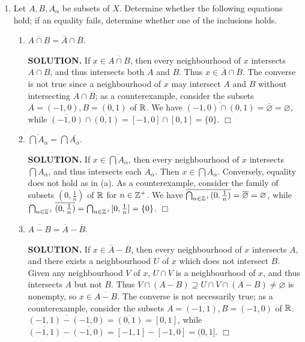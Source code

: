 \documentclass{article}
\begin{document}
\begin{enumerate}
    {\bf SOLUTION.} While it is true that every neighbourhood of $x$ intersects some $A_\alpha$, this is insufficient to conclude that $x \in \overline{A_\alpha}$ for some $\alpha$, which would require that every neighbourhood of $x$ intersects a particular $A_\alpha$. $\Box$

    \item Let $A, B, A_\alpha$ be subsets of $X$. Determine whether the following equations hold; if an equality fails, determine whether one of the inclusions holds.
    \begin{enumerate}
        \item $\overline{A \cap B} = \overline{A} \cap \overline{B}$.

        {\bf SOLUTION.} If $x \in \overline{A \cap B}$, then every neighbourhood of $x$ intersects $A \cap B$, and thus intersects both $A$ and $B$. Thus $x \in \overline{A} \cap \overline{B}$. The converse is not true since a neighbourhood of $x$ may intersect $A$ and $B$ without intersecting $A \cap B$; as a counterexample, consider the subsets $A = (-1, 0), B = (0, 1)$ of $\mathbb{R}$. We have $\overline{(-1, 0) \cap (0, 1)} = \overline{\varnothing} = \varnothing$, while $\overline{(-1, 0)} \cap \overline{(0, 1)} = [-1, 0] \cap [0, 1] = \{0\}$. $\Box$
        
        \item $\overline{\bigcap A_\alpha} = \bigcap \overline{A_\alpha}$.

        {\bf SOLUTION.} If $x \in \overline{\bigcap A_\alpha}$, then every neighbourhood of $x$ intersects $\bigcap A_\alpha$, and thus intersects each $A_\alpha$. Then $x \in \bigcap \overline{A_\alpha}$. Conversely, equality does not hold as in (a). As a counterexample, consider the family of subsets $(0, \frac1n)$ of $\mathbb{R}$ for $n \in \mathbb{Z}^+$. We have $\overline{\bigcap_{n \in \mathbb{Z}^+} (0, \frac1n)} = \overline{\varnothing} = \varnothing$, while $\bigcap_{n \in \mathbb{Z}^+} \overline{(0, \frac1n)} = \bigcap_{n \in \mathbb{Z}^+} [0, \frac1n] = \{0\}$. $\Box$
        
        \item $\overline{A - B} = \overline{A} - \overline{B}$.

        {\bf SOLUTION.} If $x \in \overline{A} - \overline{B}$, then every neighbourhood of $x$ intersects $A$, and there exists a neighbourhood $U$ of $x$ which does not intersect $B$. Given any neighbourhood $V$ of $x$, $U \cap V$ is a neighbourhood of $x$, and thus intersects $A$ but not $B$. Thus $V \cap (A - B) \supseteq U \cap V \cap (A -B) \neq \varnothing$ is nonempty, so $x \in \overline{A - B}$. The converse is not necessarily true; as a counterexample, consider the subsets $A = (-1, 1), B = (-1, 0)$ of $\mathbb{R}$. $\overline{(-1, 1) - (-1, 0)} = \overline{(0, 1)} = [0, 1]$, while $\overline{(-1, 1)} - \overline{(-1, 0)} = [-1, 1] - [-1, 0] = (0, 1]$. $\Box$
    \end{enumerate}


\end{enumerate}
\end{document}
